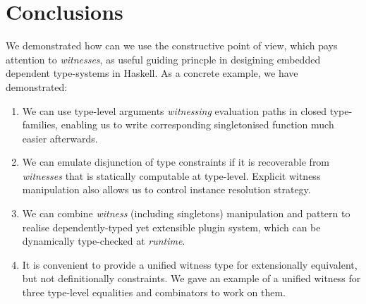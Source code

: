 \documentclass[demotion-paper.tex]{subfiles}
\begin{document}
\section{Conclusions}
We demonstrated how can we use the constructive point of view, which pays attention to \emph{witnesses}, as useful guiding princple in desigining embedded dependent type-systems in Haskell.
As a concrete example, we have demonstrated:
\begin{enumerate}
  \item We can use type-level arguments \emph{witnessing} evaluation paths in closed type-families, enabling us to write corresponding singletonised function much easier afterwards.
  \item We can emulate disjunction of type constraints if it is recoverable from \emph{witnesses} that is statically computable at type-level. Explicit witness manipulation also allows us to control instance resolution strategy.
  \item We can combine \emph{witness} (including singletons) manipulation and  pattern to realise dependently-typed yet extensible plugin system, which can be dynamically type-checked at \emph{runtime}.
  \item It is convenient to provide a unified witness type for extensionally equivalent, but not definitionally constraints.
  We gave an example of a unified witness for three type-level equalities and combinators to work on them.
\end{enumerate}

\end{document}
